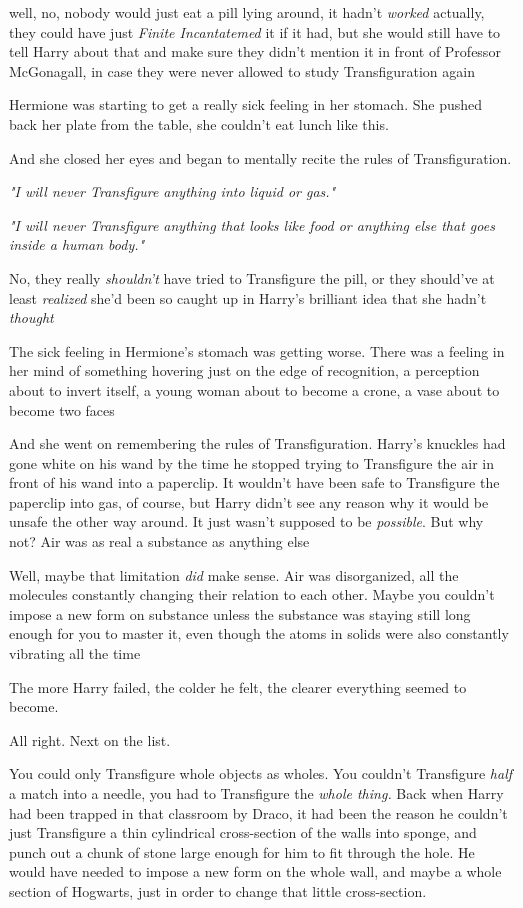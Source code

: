 {\el} well, no, nobody would just eat a pill lying around, it hadn't
\emph{worked} actually, they could have just \emph{Finite Incantatemed} it if
it had, but she would still have to tell Harry about that and make sure they
didn't mention it in front of Professor McGonagall, in case they were never
allowed to study Transfiguration again{\el}

Hermione was starting to get a really sick feeling in her stomach. She pushed
back her plate from the table, she couldn't eat lunch like this.

And she closed her eyes and began to mentally recite the rules of
Transfiguration.

\emph{"I will never Transfigure anything into liquid or gas."}

\emph{"I will never Transfigure anything that looks like food or anything else
that goes inside a human body."}

No, they really \emph{shouldn't} have tried to Transfigure the pill, or they
should've at least \emph{realized{\el}} she'd been so caught up in Harry's
brilliant idea that she hadn't \emph{thought{\el}}

The sick feeling in Hermione's stomach was getting worse. There was a feeling
in her mind of something hovering just on the edge of recognition, a perception
about to invert itself, a young woman about to become a crone, a vase about to
become two faces{\el}

And she went on remembering the rules of Transfiguration.
\sbreak
Harry's knuckles had gone white on his wand by the time he stopped trying to
Transfigure the air in front of his wand into a paperclip. It wouldn't have
been safe to Transfigure the paperclip into gas, of course, but Harry didn't
see any reason why it would be unsafe the other way around. It just wasn't
supposed to be \emph{possible}. But why not? Air was as real a substance as
anything else{\el}

Well, maybe that limitation \emph{did} make sense. Air was disorganized, all
the molecules constantly changing their relation to each other. Maybe you
couldn't impose a new form on substance unless the substance was staying still
long enough for you to master it, even though the atoms in solids were also
constantly vibrating all the time{\el}

The more Harry failed, the colder he felt, the clearer everything seemed to
become.

All right. Next on the list.

You could only Transfigure whole objects as wholes. You couldn't Transfigure
\emph{half} a match into a needle, you had to Transfigure the \emph{whole
thing.} Back when Harry had been trapped in that classroom by Draco, it had
been the reason he couldn't just Transfigure a thin cylindrical cross-section
of the walls into sponge, and punch out a chunk of stone large enough for him
to fit through the hole. He would have needed to impose a new form on the whole
wall, and maybe a whole section of Hogwarts, just in order to change that
little cross-section.

